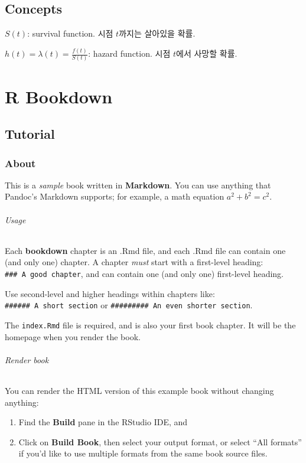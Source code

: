 \documentclass[
]{book}
\begin{document}
{{{\hypertarget{concepts}{%
\section{Concepts}\label{concepts}}

\(S(t)\): survival function. 시점 \(t\)까지는 살아있을 확률.

\(h(t) = \lambda(t) = \frac{f(t)}{S(t)}\): hazard function. 시점 \(t\)에서 사망할 확률.

\hypertarget{appendix-00-00}{%
\appendix}


\hypertarget{r-bookdown}{%
\chapter{R Bookdown}\label{r-bookdown}}

\hypertarget{tutorial}{%
\section{Tutorial}\label{tutorial}}

\hypertarget{about}{%
\subsection{About}\label{about}}

This is a \emph{sample} book written in \textbf{Markdown}. You can use anything that Pandoc's Markdown supports; for example, a math equation \(a^2 + b^2 = c^2\).

\hypertarget{usage}{%
\subparagraph{Usage}\label{usage}}

Each \textbf{bookdown} chapter is an .Rmd file, and each .Rmd file can contain one (and only one) chapter. A chapter \emph{must} start with a first-level heading: \texttt{\#\#\#\ A\ good\ chapter}, and can contain one (and only one) first-level heading.

Use second-level and higher headings within chapters like: \texttt{\#\#\#\#\#\#\ A\ short\ section} or \texttt{\#\#\#\#\#\#\#\#\#\ An\ even\ shorter\ section}.

The \texttt{index.Rmd} file is required, and is also your first book chapter. It will be the homepage when you render the book.

\hypertarget{render-book}{%
\subparagraph{Render book}\label{render-book}}

You can render the HTML version of this example book without changing anything:

\begin{enumerate}
\def\labelenumi{\arabic{enumi}.}
\item
  Find the \textbf{Build} pane in the RStudio IDE, and
\item
  Click on \textbf{Build Book}, then select your output format, or select ``All formats'' if you'd like to use multiple formats from the same book source files.
\end{enumerate}

}}}
\end{document}
